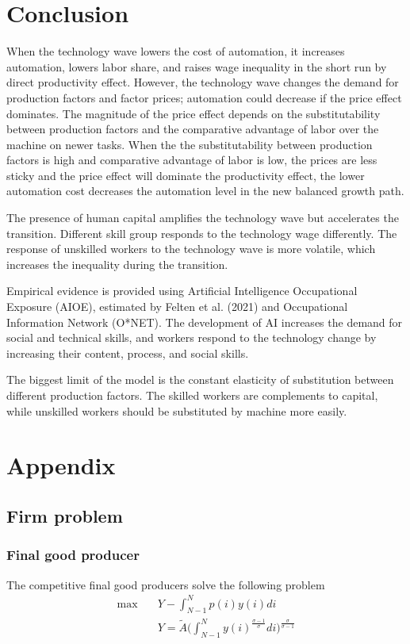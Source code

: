 \documentclass[12pt]{article}
\begin{document}
\section{Conclusion}

When the technology wave lowers the cost of automation, it increases automation, lowers labor share, and raises wage inequality in the short run by direct productivity effect. However, the technology wave changes the demand for production factors and factor prices; automation could decrease if the price effect dominates. The magnitude of the price effect depends on the substitutability between production factors and the comparative advantage of labor over the machine on newer tasks. When the the substitutability between production factors is high and comparative advantage of labor is low, the prices are less sticky and the price effect will dominate the productivity effect, the lower automation cost decreases the automation level in the new balanced growth path. 

The presence of human capital amplifies the technology wave but accelerates the transition. Different skill group responds to the technology wage differently. The response of unskilled workers to the technology wave is more volatile, which increases the inequality during the transition. 

Empirical evidence is provided using Artificial Intelligence Occupational Exposure (AIOE), estimated by Felten et al. (2021) and Occupational Information Network (O*NET). The development of AI increases the demand for social and technical skills, and workers respond to the technology change by increasing their content, process, and social skills. 

The biggest limit of the model is the constant elasticity of substitution between different production factors. The skilled workers are complements to capital, while unskilled workers should be substituted by machine more easily. 


\clearpage



\section*{Appendix}

\subsection*{Firm problem}

\subsubsection*{Final good producer}
The competitive final good producers solve the following problem 
\begin{align*}
\max \quad & Y-\int_{N-1}^Np(i)y(i)di \\
&Y = \tilde{A}\Big(\int_{N-1}^{N}y(i)^{\frac{\sigma-1}{\sigma}}di\Big)^{\frac{\sigma}{\sigma-1}}
\end{align*}
\end{document}
